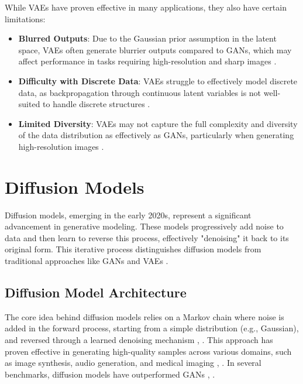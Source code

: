 While VAEs have proven effective in many applications, they also have certain limitations:
\begin{itemize}
    \item \textbf{Blurred Outputs}: Due to the Gaussian prior assumption in the latent space, VAEs often generate blurrier outputs compared to GANs, which may affect performance in tasks requiring high-resolution and sharp images \citep{10.1109/access.2020.2977671}.
    \item \textbf{Difficulty with Discrete Data}: VAEs struggle to effectively model discrete data, as backpropagation through continuous latent variables is not well-suited to handle discrete structures \citep{10.48550/arxiv.1909.13062}.
    \item \textbf{Limited Diversity}: VAEs may not capture the full complexity and diversity of the data distribution as effectively as GANs, particularly when generating high-resolution images \citep{10.48550/arxiv.2106.06500}.
\end{itemize}

\section{Diffusion Models}

Diffusion models, emerging in the early 2020s, represent a significant advancement in generative modeling. These models progressively add noise to data and then learn to reverse this process, effectively "denoising" it back to its original form. This iterative process distinguishes diffusion models from traditional approaches like GANs and VAEs \citep{10.48550/arxiv.2105.05233}.

\subsection{Diffusion Model Architecture}

The core idea behind diffusion models relies on a Markov chain where noise is added in the forward process, starting from a simple distribution (e.g., Gaussian), and reversed through a learned denoising mechanism \citep{10.48550/arxiv.2009.09761}, \citep{10.48550/arxiv.2206.05564}. This approach has proven effective in generating high-quality samples across various domains, such as image synthesis, audio generation, and medical imaging \citep{10.48550/arxiv.2201.11972}, \citep{10.48550/arxiv.2211.00611}. In several benchmarks, diffusion models have outperformed GANs \citep{10.48550/arxiv.2105.05233}, \citep{10.48550/arxiv.2201.00308}.


